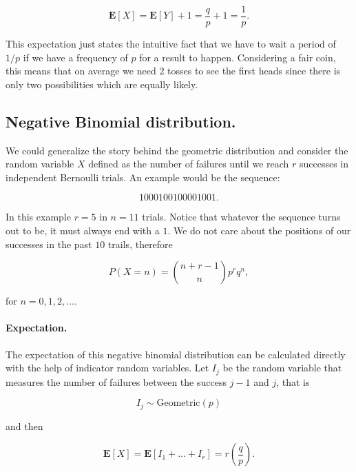 \documentclass[12pt]{article}
\begin{document}
\begin{equation}
\mathbf{E} [X] = \mathbf{E} [Y] + 1 = \frac{q}{p} + 1 = 
\frac{1}{p}.
\end{equation}

\noindent
This expectation just states the intuitive fact that we have to wait
a period of $1/p$ if we have a frequency of $p$ for a result to happen.
Considering a fair coin, this means that on average we need $2$ tosses
to see the first heads since there is only two possibilities which are
equally likely.


\subsection{Negative Binomial distribution.}

We could generalize the story behind the geometric distribution and consider the 
random variable $X$ defined as the number of failures until we reach $r$ successes in independent Bernoulli
trials.
An example would be the sequence:

\begin{equation}
1000100100001001.
\end{equation}

\noindent
In this example $r = 5$ in $n=11$ trials.
Notice that whatever the sequence turns out to be, it must always end with a $1$. 
We do not care about the positions of our successes in the past $10$ trails,
therefore

\begin{equation}
P( X = n ) = { n + r - 1 \choose n } p^{r} q^{n},
\end{equation}

\noindent
for $n = 0, 1, 2, \ldots$.

\paragraph{Expectation.}
The expectation of this negative binomial distribution can be calculated directly
with the help of indicator random variables. 
Let $I_j$ be the random variable that measures the number of failures between the 
success $j-1$ and $j$, that is 

\begin{equation}
I_{j} \sim \text{Geometric}(p)
\end{equation}

\noindent
and then 

\begin{equation}
\mathbf{E}[X] = \mathbf{E} \left[ 
I_1 + \ldots + I_r \right] = r \left( \frac{q}{p} \right).
\end{equation}
\end{document}

